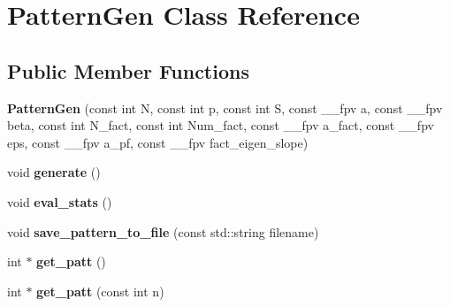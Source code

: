 \hypertarget{classPatternGen}{}\section{Pattern\+Gen Class Reference}
\label{classPatternGen}
\subsection*{Public Member Functions}
\begin{DoxyCompactItemize}
\item 
{\bfseries Pattern\+Gen} (const int N, const int p, const int S, const \+\_\+\+\_\+fpv a, const \+\_\+\+\_\+fpv beta, const int N\+\_\+fact, const int Num\+\_\+fact, const \+\_\+\+\_\+fpv a\+\_\+fact, const \+\_\+\+\_\+fpv eps, const \+\_\+\+\_\+fpv a\+\_\+pf, const \+\_\+\+\_\+fpv fact\+\_\+eigen\+\_\+slope)\hypertarget{classPatternGen_ae347681b782de3d3b415f5e0212c687c}{}\label{classPatternGen_ae347681b782de3d3b415f5e0212c687c}

\item 
void {\bfseries generate} ()\hypertarget{classPatternGen_a1e77dc569b771ee5185f51c7ca900e1a}{}\label{classPatternGen_a1e77dc569b771ee5185f51c7ca900e1a}

\item 
void {\bfseries eval\+\_\+stats} ()\hypertarget{classPatternGen_ace5ff5d0cb3ccc4b8b4941a22096dbc2}{}\label{classPatternGen_ace5ff5d0cb3ccc4b8b4941a22096dbc2}

\item 
void {\bfseries save\+\_\+pattern\+\_\+to\+\_\+file} (const std\+::string filename)\hypertarget{classPatternGen_ae33872117e255a8db86ea50d1a9cb413}{}\label{classPatternGen_ae33872117e255a8db86ea50d1a9cb413}

\item 
int $\ast$ {\bfseries get\+\_\+patt} ()\hypertarget{classPatternGen_a4c3e875c5a117b4fd3de9a83bc396df8}{}\label{classPatternGen_a4c3e875c5a117b4fd3de9a83bc396df8}

\item 
int $\ast$ {\bfseries get\+\_\+patt} (const int n)\hypertarget{classPatternGen_aaceb7c87b9efea67ba77ca78e2352bae}{}\label{classPatternGen_aaceb7c87b9efea67ba77ca78e2352bae}

\end{DoxyCompactItemize}
